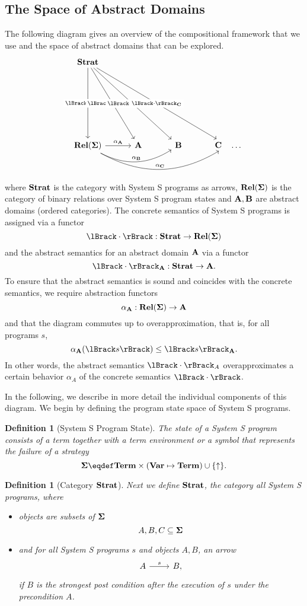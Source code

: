 \documentclass{article}
\newtheorem{definition}[theorem]{Definition}
\begin{document}
\subsection{The Space of Abstract Domains}

The following diagram gives an overview of the compositional framework \citep{steffen1992compositional} that we use and the space of abstract domains that can be explored.
\[
\begin{tikzcd}[row sep=3cm,column sep=1.1cm]
 \Strat \arrow{2-1}[description]{\sem{\cdot}} \arrow{2-2}[description]{\sem{\cdot}_{\Cat{A}}} \arrow{2-3}[description]{\sem{\cdot}_{\Cat{B}}} \arrow{2-4}[description]{\sem{\cdot}_{\Cat{C}}} & & & \\
 \Rel(\State) \arrow{r}{\alpha_{\Cat{A}}} \ar[rr,bend right,"\alpha_{\Cat{B}}"] \ar[rrr,bend right,"\alpha_{\Cat{C}}"] & \Cat{A} & \Cat{B} & \Cat{C} \quad \ldots
\end{tikzcd}
\]
where $\mathbf{Strat}$ is the category with System S programs as arrows, $\mathbf{Rel}(\mathbf{\Sigma})$ is the category of binary relations over System S program states and $\mathbf{A},\mathbf{B}$ are abstract domains (ordered categories). The concrete semantics of System S programs is assigned via a functor \[\sem{\cdot}: \Strat \rightarrow \Rel(\State)\] and the abstract semantics for an abstract domain $\mathbf{A}$ via a functor \[\sem{\cdot}_{\Cat{A}} : \Strat \rightarrow \Cat{A}. \] To ensure that the abstract semantics is sound and coincides with the concrete semantics, we require abstraction functors \[\alpha_{\mathbf{A}} : \mathbf{Rel}(\mathbf{\Sigma}) \rightarrow \mathbf{A} \] and that the diagram commutes up to overapproximation, that is, for all programs $s$, \[ \alpha_{\Cat{A}}(\sem{s}) \leq \sem{s}_{\Cat{A}}. \] In other words, the abstract semantics $\sem{\cdot}_A$ overapproximates a certain behavior $\alpha_A$ of the concrete semantics $\sem{\cdot}$.

In the following, we describe in more detail the individual components of this diagram. We begin by defining the program state space of System S programs.

\begin{definition}[System S Program State] \normalfont
The state of a System S program consists of a term together with a term environment or a symbol that represents the failure of a strategy \[\State \eqdef \Term \times (\Env) \cup \{ \fail \}.\]  
\end{definition}

\begin{definition}[Category $\mathbf{Strat}$] \normalfont
  Next we define $\mathbf{Strat}$, the category all System S programs, where
  \begin{itemize}
  \item objects are subsets of $\mathbf{\Sigma}$ \[A, B, C \subseteq \mathbf{\Sigma}\]
  \item and for all System S programs $s$ and objects $A,B$, an arrow \[\begin{tikzcd} A \ar[r,"s"] & B, \end{tikzcd}\] if $B$ is the strongest post condition after the execution of $s$ under the precondition $A$.
  \end{itemize}
\end{definition}
\end{document}

